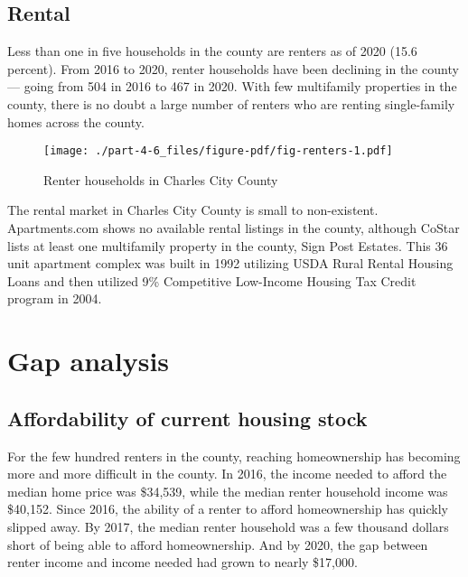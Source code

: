 \documentclass[
  letterpaper,
  DIV=11,
  numbers=noendperiod]{scrreprt}
\begin{document}
\hypertarget{rental-5}{%
\subsection{Rental}\label{rental-5}}

Less than one in five households in the county are renters as of 2020
(15.6 percent). From 2016 to 2020, renter households have been declining
in the county --- going from 504 in 2016 to 467 in 2020. With few
multifamily properties in the county, there is no doubt a large number
of renters who are renting single-family homes across the county.

\begin{figure}

{\centering \texttt{[image: ./part-4-6\_files/figure-pdf/fig-renters-1.pdf]}

}

\caption{\label{fig-renters}Renter households in Charles City County}

\end{figure}

The rental market in Charles City County is small to non-existent.
Apartments.com shows no available rental listings in the county,
although CoStar lists at least one multifamily property in the county,
Sign Post Estates. This 36 unit apartment complex was built in 1992
utilizing USDA Rural Rental Housing Loans and then utilized 9\%
Competitive Low-Income Housing Tax Credit program in 2004.

\hypertarget{gap-analysis-5}{%
\section{Gap analysis}\label{gap-analysis-5}}

\hypertarget{affordability-of-current-housing-stock-5}{%
\subsection{Affordability of current housing
stock}\label{affordability-of-current-housing-stock-5}}

For the few hundred renters in the county, reaching homeownership has
becoming more and more difficult in the county. In 2016, the income
needed to afford the median home price was \$34,539, while the median
renter household income was \$40,152. Since 2016, the ability of a
renter to afford homeownership has quickly slipped away. By 2017, the
median renter household was a few thousand dollars short of being able
to afford homeownership. And by 2020, the gap between renter income and
income needed had grown to nearly \$17,000.
\end{document}
